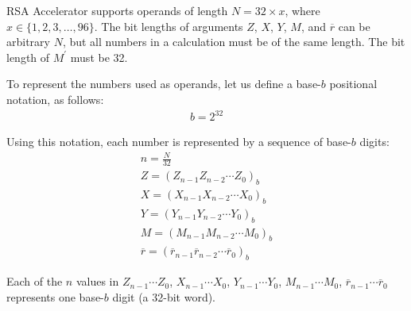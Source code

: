 \documentclass[main\_\_EN.tex]{subfiles}
\begin{document}
RSA Accelerator supports operands of length \begin{math}N = 32 \times x\end{math}, where \begin{math}x \in \{ 1,2,3, \dots, 96\} \end{math}. The bit lengths of arguments \begin{math}Z\end{math}, \begin{math}X\end{math}, \begin{math}Y\end{math}, \begin{math}M\end{math}, and \begin{math}\overline{r}\end{math}
can be arbitrary \begin{math}N\end{math}, but all numbers in a calculation must be of the same length. The bit length of \begin{math}M^{\prime}\end{math} must be 32.

To represent the numbers used as operands, let us define a base-\begin{math}b\end{math} positional notation, as follows:
\begin{gather*}
    b = 2^{32}
\end{gather*}

Using this notation, each number is represented by a sequence of base-\begin{math}b\end{math} digits:
\begin{gather*}
    n = \frac{N}{32} \\
    Z = ( Z_{n-1} Z_{n-2} \cdots Z_{0} )_{b} \\
    X = ( X_{n-1} X_{n-2} \cdots X_{0} )_{b} \\
    Y = ( Y_{n-1} Y_{n-2} \cdots Y_{0} )_{b} \\
    M = ( M_{n-1} M_{n-2} \cdots M_{0} )_{b} \\
    \overline{r} = ( \overline{r}_{n-1} \overline{r}_{n-2} \cdots \overline{r}_{0} )_{b}
\end{gather*}

Each of the \begin{math}n\end{math} values in 
\begin{math}Z_{n-1} \cdots Z_{0}\end{math},
\begin{math}X_{n-1} \cdots X_{0}\end{math},
\begin{math}Y_{n-1} \cdots Y_{0}\end{math},
\begin{math}M_{n-1} \cdots M_{0}\end{math},
\begin{math}\overline{r}_{n-1}\cdots \overline{r}_{0}\end{math} represents one base-\begin{math}b\end{math} digit (a 32-bit word).
\end{document}
